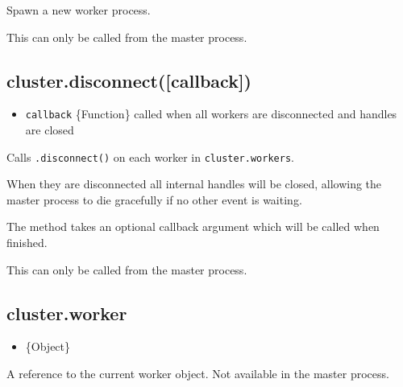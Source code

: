 Spawn a new worker process.

This can only be called from the master process.

\subsection{cluster.disconnect({[}callback{]})}\label{cluster.disconnectcallback}

\begin{itemize}
\itemsep1pt\parskip0pt
\item
  \texttt{callback} \{Function\} called when all workers are
  disconnected and handles are closed
\end{itemize}

Calls \texttt{.disconnect()} on each worker in \texttt{cluster.workers}.

When they are disconnected all internal handles will be closed, allowing
the master process to die gracefully if no other event is waiting.

The method takes an optional callback argument which will be called when
finished.

This can only be called from the master process.

\subsection{cluster.worker}\label{cluster.worker}

\begin{itemize}
\itemsep1pt\parskip0pt
\item
  \{Object\}
\end{itemize}

A reference to the current worker object. Not available in the master
process.

\begin{Shaded}
\begin{Highlighting}[]
 \NormalTok{(}\NormalTok{);}

 \NormalTok{(}\NormalTok{) \{}
  \NormalTok{(}\NormalTok{);}
  \NormalTok{();}
  \NormalTok{();}
\NormalTok{\} }  \NormalTok{(}\NormalTok{) \{}
  \NormalTok{(} \NormalTok{+ }\NormalTok{);}
\NormalTok{\}}
\end{Highlighting}
\end{Shaded}

